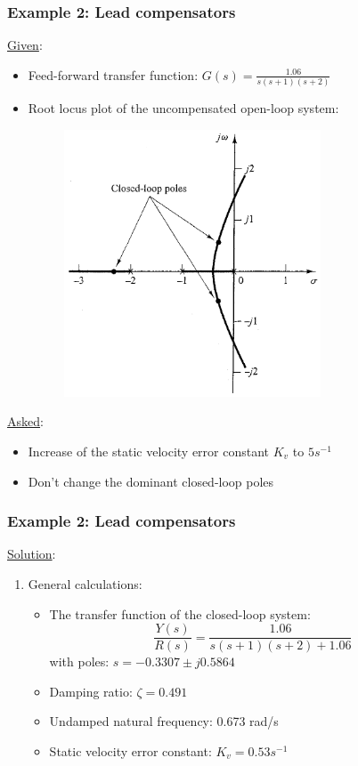 \begin{frame}
	\frametitle{Example 2: Lead compensators}
	\underline{Given}:
	\begin{itemize}
		\item Feed-forward transfer function: $G(s)=\frac{1.06}{s(s+1)(s+2)}$
		\item Root locus plot of the uncompensated open-loop system:
		\begin{figure}
			\centering
			\includegraphics[width=0.3\linewidth]{Ex2_rootlocus}
		\end{figure}
	\end{itemize}
	\underline{Asked}:
	\begin{itemize}
		\item Increase of the static velocity error constant $K_v$ to $5s^{-1}$
		\item Don't change the dominant closed-loop poles
	\end{itemize}
\end{frame}

\begin{frame}
	\frametitle{Example 2: Lead compensators}
	\underline{Solution}:
	\begin{enumerate}
		\item General calculations:
		\begin{itemize}
			\item The transfer function of the closed-loop system:
			$$\frac{Y(s)}{R(s)}=\frac{1.06}{s(s+1)(s+2)+1.06}$$ with poles: $s=-0.3307\pm j0.5864$
			\item Damping ratio: $\zeta=0.491$
			\item Undamped natural frequency: 0.673 rad/s
			\item Static velocity error constant: $K_v=0.53s^{-1}$
		\end{itemize}
	\end{enumerate}
\end{frame}

